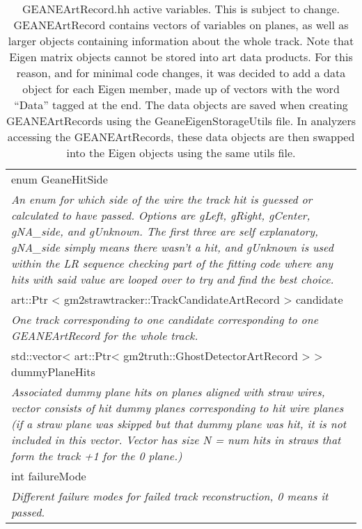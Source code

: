 \begin{longtable}{|p{16cm}|}
\caption{GEANEArtRecord.hh active variables. This is subject to change. GEANEArtRecord contains vectors of variables on planes, as well as larger objects containing information about the whole track. Note that Eigen matrix objects cannot be stored into art data products. For this reason, and for minimal code changes, it was decided to add a data object for each Eigen member, made up of vectors with the word ``Data'' tagged at the end. The data objects are saved when creating GEANEArtRecords using the GeaneEigenStorageUtils file. In analyzers accessing the GEANEArtRecords, these data objects are then swapped into the Eigen objects using the same utils file.}
 
\label{tab:artRecord}


  \\ \hline

enum GeaneHitSide \\ 
\textit{An enum for which side of the wire the track hit is guessed or calculated to have passed. Options are gLeft, gRight, gCenter, gNA\_side, and gUnknown. The first three are self explanatory, gNA\_side simply means there wasn't a hit, and gUnknown is used within the LR sequence checking part of the fitting code where any hits with said value are looped over to try and find the best choice.}

  \\ \hline

art::Ptr \textless{} gm2strawtracker::TrackCandidateArtRecord \textgreater{} candidate \\
\textit{One track corresponding to one candidate corresponding to one GEANEArtRecord for the whole track.} \\ \hline

std::vector\textless{} art::Ptr\textless{} gm2truth::GhostDetectorArtRecord \textgreater{} \textgreater{} dummyPlaneHits \\
\textit{Associated dummy plane hits on planes aligned with straw wires, vector consists of hit dummy planes corresponding to hit wire planes (if a straw plane was skipped but that dummy plane was hit, it is not included in this vector. Vector has size N = num hits in straws that form the track +1 for the 0 plane.)} \\ \hline

int failureMode \\ 
\textit{Different failure modes for failed track reconstruction, 0 means it passed.} \\ \hline


\end{longtable}
